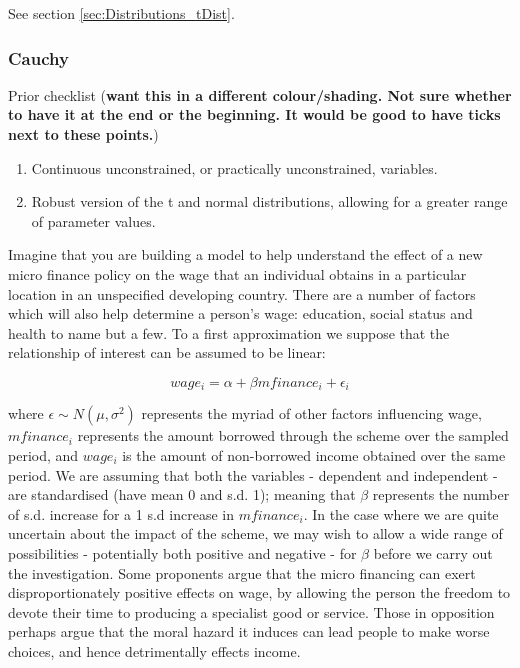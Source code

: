 \documentclass[11pt,fullpage]{book}
\begin{document}
See section \ref{sec:Distributions_tDist}.

\subsubsection{Cauchy}\label{sec:Distributions_cauchy}
Prior checklist (\textbf{want this in a different colour/shading. Not sure whether to have it at the end or the beginning. It would be good to have ticks next to these points.})

\begin{enumerate} 
\item Continuous unconstrained, or practically unconstrained, variables.
\item Robust version of the t and normal distributions, allowing for a greater range of parameter values.
\end{enumerate}

Imagine that you are building a model to help understand the effect of a new micro finance policy on the wage that an individual obtains in a particular location in an unspecified developing country. There are a number of factors which will also help determine a person's wage: education, social status and health to name but a few. To a first approximation we suppose that the relationship of interest can be assumed to be linear:

\begin{equation}
wage_i = \alpha + \beta mfinance_i + \epsilon_i
\end{equation}

where $\epsilon\sim N(\mu,\sigma^2)$ represents the myriad of other factors influencing wage, $mfinance_i$ represents the amount borrowed through the scheme over the sampled period, and $wage_i$ is the amount of non-borrowed income obtained over the same period. We are assuming that both the variables - dependent and independent - are standardised (have mean 0 and s.d. 1); meaning that $\beta$ represents the number of s.d. increase for a 1 s.d increase in $mfinance_i$. In the case where we are quite uncertain about the impact of the scheme, we may wish to allow a wide range of possibilities - potentially both positive and negative - for $\beta$ before we carry out the investigation. Some proponents argue that the micro financing can exert disproportionately positive effects on wage, by allowing the person the freedom to devote their time to producing a specialist good or service. Those in opposition perhaps argue that the moral hazard it induces can lead people to make worse choices, and hence detrimentally effects income.
\end{document}
